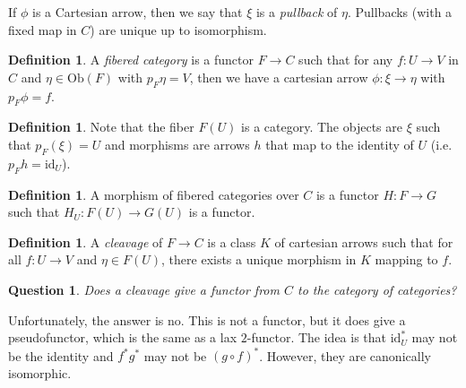 \documentclass[leqno, openany]{memoir}
\newtheorem{quest}[thm]{Question}
\theoremstyle{definition}
\newtheorem{defn}[thm]{Definition}
\theoremstyle{remark}
\theoremstyle{plain}
\theoremstyle{definition}
\theoremstyle{remark}
\newcommand{\mr}[1]{\mathrm{#1}}
\begin{document}
If $\phi$ is a Cartesian arrow, then we say that $\xi$ is a \textit{pullback} of $\eta$. Pullbacks (with a fixed map in $C$) are unique up to isomorphism.

\begin{defn}
    A \textit{fibered category} is a functor $F \to C$ such that for any $f \colon U \to V$ in $C$ and $\eta \in \mr{Ob}(F)$ with $p_F \eta = V$, then we have a cartesian arrow $\phi \colon \xi \to \eta$ with $p_F \phi = f$.
\end{defn}

\begin{defn}
    Note that the fiber $F(U)$ is a category. The objects are $\xi$ such that $p_F(\xi) = U$ and morphisms are arrows $h$ that map to the identity of $U$ (i.e. $p_F h = \mr{id}_U$).
\end{defn}

\begin{defn}
    A morphism of fibered categories over $C$ is a functor $H \colon F \to G$ such that $H_U \colon F(U) \to G(U)$ is a functor.
\end{defn}

\begin{defn}
    A \textit{cleavage} of $F \to C$ is a class $K$ of cartesian arrows such that for all $f \colon U \to V$ and $\eta \in F(U)$, there exists a unique morphism in $K$ mapping to $f$.
\end{defn}

\begin{quest}
    Does a cleavage give a functor from $C$ to the category of categories?
\end{quest}

Unfortunately, the answer is no. This is not a functor, but it does give a pseudofunctor, which is the same as a lax $2$-functor. The idea is that $\mr{id}_U^*$ may not be the identity and $f^* g^*$ may not be $(g \circ f)^*$. However, they are canonically isomorphic.
\end{document}
